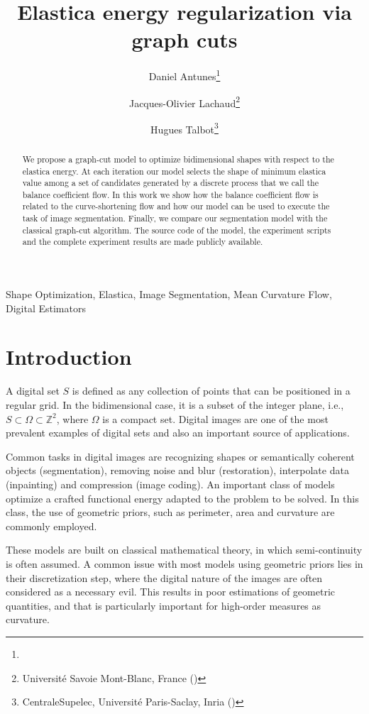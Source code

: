 \documentclass[review]{siamart220329}
\title{Elastica energy regularization via graph cuts}
\author{Daniel Antunes\thanks{\email{danoan2008@gmail.com}}
\and Jacques-Olivier Lachaud\thanks{Universit\'e Savoie Mont-Blanc, France (\email{jacques-olivier.lachaud@univ-smb.fr})}
\and Hugues Talbot\thanks{CentraleSupelec, Universit\'e Paris-Saclay, Inria (\email{hugues.talbot@centralesupelec.fr})}}
\begin{document}
\maketitle

\begin{abstract}
We propose a graph-cut model to optimize bidimensional shapes with respect to the elastica energy. At each iteration our model
selects the shape of minimum elastica value among a set of candidates generated by a discrete process that we call the balance 
coefficient flow. In this work we show how the balance coefficient flow is related to the curve-shortening flow and how our
model can be used to execute the task of image segmentation. Finally, we compare our segmentation model with the classical graph-cut
algorithm. The source code of the model, the experiment scripts and the complete experiment results are made publicly available.
\end{abstract}

\begin{keywords}
Shape Optimization, Elastica, Image Segmentation, Mean Curvature Flow, Digital Estimators
\end{keywords}

\section{Introduction}

A digital set $S$ is defined as any collection of points that can be positioned in a regular grid. In the bidimensional case, it is a subset of the integer plane, i.e., $S \subset \Omega \subset \mathbb{Z}^2$, where $\Omega$ is a compact set. Digital images are one of the most prevalent examples of digital sets and also an important source of applications.

Common tasks in digital images are recognizing shapes or semantically coherent objects (segmentation), removing noise and blur (restoration), interpolate data (inpainting) and compression (image coding). An important class of models optimize a crafted functional energy adapted to the problem to be solved. In this class, the use of geometric priors, such as perimeter, area and curvature are commonly employed.

These models are built on classical mathematical theory, in which semi-continuity is often assumed. A common issue with most models using geometric priors lies in their discretization step, where the digital nature of the images are often considered as a necessary evil. This results in poor estimations of geometric quantities, and that is particularly important for high-order measures as curvature.
\end{document}
